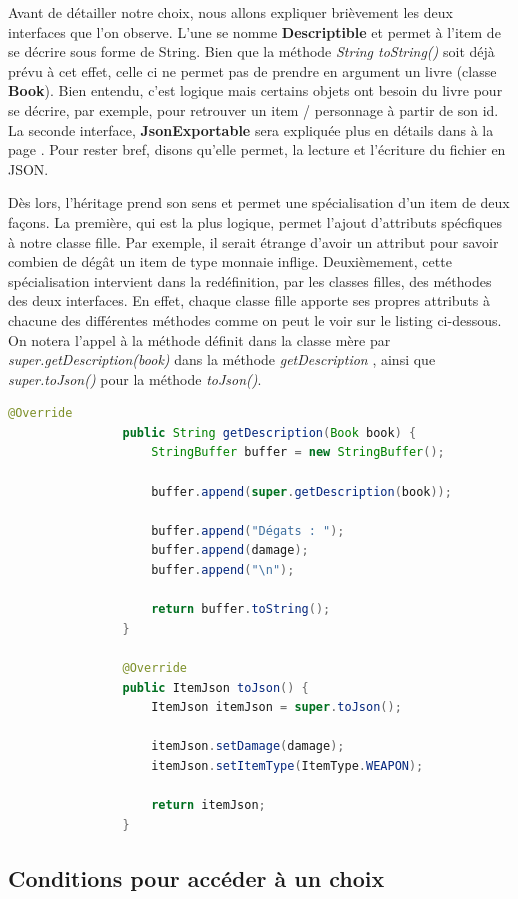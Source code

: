 			Avant de détailler notre choix, nous allons expliquer brièvement les deux interfaces que l'on observe. L'une se nomme \textbf{Descriptible} et permet à l'item de se décrire sous forme de String. Bien que la méthode \textit{String toString()} soit déjà prévu à cet effet, celle ci ne permet pas de prendre en argument un livre (classe \textbf{Book}). Bien entendu, c'est logique mais certains objets ont besoin du livre pour se décrire, par exemple, pour retrouver un item / personnage à partir de son id. La seconde interface, \textbf{JsonExportable} sera expliquée plus en détails dans  à la page \pageref{subsec:lecture_ecriture_fichier}. Pour rester bref, disons qu'elle permet, la lecture et l'écriture du fichier en JSON.

			Dès lors, l'héritage prend son sens et permet une spécialisation d'un item de deux façons. La première, qui est la plus logique, permet l'ajout d'attributs spécfiques à notre classe fille. Par exemple, il serait étrange d'avoir un attribut pour savoir combien de dégât un item de type monnaie inflige. Deuxièmement, cette spécialisation intervient dans la redéfinition, par les classes filles, des méthodes des deux interfaces. En effet, chaque classe fille apporte ses propres attributs à chacune des différentes méthodes comme on peut le voir sur le listing ci-dessous. On notera l'appel à la méthode définit dans la classe mère par \textit{super.getDescription(book)} dans la méthode \textit{getDescription} , ainsi que \textit{super.toJson()} pour la méthode \textit{toJson()}.

			\begin{lstlisting}[gobble=16, language=Java, caption=Exemple de spécialisation des items]
				@Override
				public String getDescription(Book book) {
					StringBuffer buffer = new StringBuffer();

					buffer.append(super.getDescription(book));

					buffer.append("Dégats : ");
					buffer.append(damage);
					buffer.append("\n");

					return buffer.toString();
				}

				@Override
				public ItemJson toJson() {
					ItemJson itemJson = super.toJson();

					itemJson.setDamage(damage);
					itemJson.setItemType(ItemType.WEAPON);

					return itemJson;
				}
			\end{lstlisting}

		\subsection{Conditions pour accéder à un choix}

